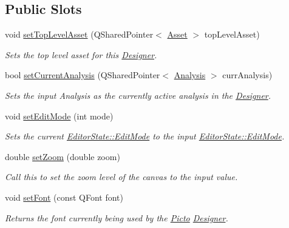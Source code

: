 \subsection*{Public Slots}
\begin{DoxyCompactItemize}
\item 
void \hyperlink{class_editor_state_a0bff406b82ba28c7b2c9c8a847f4d77a}{set\-Top\-Level\-Asset} (Q\-Shared\-Pointer$<$ \hyperlink{class_picto_1_1_asset}{Asset} $>$ top\-Level\-Asset)
\begin{DoxyCompactList}\small\item\em Sets the top level asset for this \hyperlink{class_designer}{Designer}. \end{DoxyCompactList}\item 
bool \hyperlink{class_editor_state_a323672e3b605153f0a41f72c22865064}{set\-Current\-Analysis} (Q\-Shared\-Pointer$<$ \hyperlink{class_picto_1_1_analysis}{Analysis} $>$ curr\-Analysis)
\begin{DoxyCompactList}\small\item\em Sets the input Analysis as the currently active analysis in the \hyperlink{class_designer}{Designer}. \end{DoxyCompactList}\item 
void \hyperlink{class_editor_state_a4403aeb7c9354f48139d5312bce1e638}{set\-Edit\-Mode} (int mode)
\begin{DoxyCompactList}\small\item\em Sets the current \hyperlink{class_editor_state_a30123e595784b2228edc2a0c2b46ab28}{Editor\-State\-::\-Edit\-Mode} to the input \hyperlink{class_editor_state_a30123e595784b2228edc2a0c2b46ab28}{Editor\-State\-::\-Edit\-Mode}. \end{DoxyCompactList}\item 
double \hyperlink{class_editor_state_ae58330ad315ac63798b5a7f80c9fb9ca}{set\-Zoom} (double zoom)
\begin{DoxyCompactList}\small\item\em Call this to set the zoom level of the canvas to the input value. \end{DoxyCompactList}\item 
void \hyperlink{class_editor_state_a223d839ffbe770e3a4df806a57c196c1}{set\-Font} (const Q\-Font font)
\begin{DoxyCompactList}\small\item\em Returns the font currently being used by the \hyperlink{namespace_picto}{Picto} \hyperlink{class_designer}{Designer}. \end{DoxyCompactList}\item 

\end{DoxyCompactItemize}
